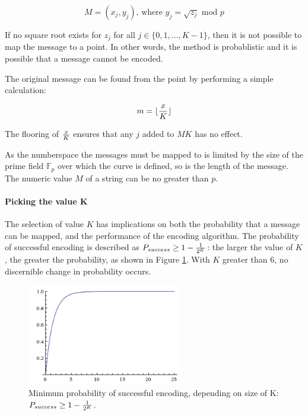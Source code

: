 \begin{equation}
	M = (x_j, y_j) \text{, where } y_j = \sqrt{z_j} \text{ mod } p
\end{equation}

If no square root exists for \(z_j\) for all \(j \in \{0,1,...,K-1\}\), then it is not possible to map the message to a point. In other
words, the method is probablistic and it is possible that a message cannot be encoded.

The original message can be found from the point by performing a simple calculation:

\begin{equation}
	m = {\lfloor {x \over K} \rfloor}
\end{equation}

The flooring of \(x \over K\) ensures that any \(j\) added to \(MK\) has no effect.\cite{MappingAMessage}

As the numberspace the messages must be mapped to is limited by the size of the prime field \(\mathbb{F}_p\) over which the curve is defined, so is the
length of the message. The numeric value \(M\) of a string can be no greater than \(p\).

\paragraph{Picking the value K}

The selection of value \(K\) has implications on both the probability that a message can be mapped, and the performance of the encoding algorithm.
The probability of successful encoding is described as \(P_{success} \geq 1 - {1 \over {2^K}}\): the larger the value of \(K\), the greater the probability,
as shown in Figure \ref{fig:probability}. With \(K\) greater than 6, no discernible change in probability occurs.\cite{MappingAMessage}

\begin{figure}[htb]
	\centering
	\includegraphics[width=0.6\textwidth]{maths/encoding-probability}
	\caption{Minimum probability of successful encoding, depending on size of K: \(P_{success} \geq 1 - {1 \over {2^K}}\).}
	\label{fig:probability}
\end{figure}


